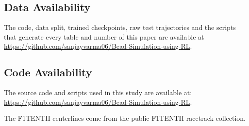 \documentclass[10pt,twocolumn,twoside]{article}
\begin{document}
\subsection*{Data Availability}
The code, data split, trained checkpoints, raw test trajectories and the
scripts that generate every table and number of this paper are available at
\url{https://github.com/sanjayvarma06/Bead-Simulation-using-RL}.

\subsection*{Code Availability}
The source code and scripts used in this study are available at:
\url{https://github.com/sanjayvarma06/Bead-Simulation-using-RL}.

The F1TENTH centerlines come from
the public F1TENTH racetrack collection.
\end{document}
